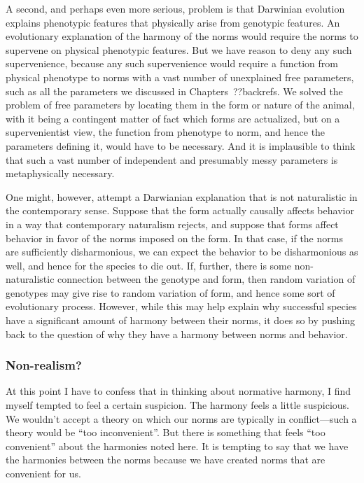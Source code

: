 A second, and perhaps even more serious, problem is that Darwinian evolution explains phenotypic features that physically arise 
from genotypic features. An evolutionary explanation of the harmony of the norms would require the norms to supervene on 
physical phenotypic features. But we have reason to deny any such supervenience, because any such supervenience would require
a function from physical phenotype to norms with a vast number of unexplained free parameters, such as all the parameters we
discussed in Chapters~??backrefs. We solved the problem of free parameters by locating them in the form or nature of the 
animal, with it being a contingent matter of fact which forms are actualized, but on a supervenientist view, the function 
from phenotype to norm, and hence the parameters defining it, would have to be necessary. And it is implausible to think 
that such a vast number of independent and presumably messy parameters is metaphysically necessary.

One might, however, attempt a Darwianian explanation that is not naturalistic in the contemporary sense. Suppose that 
the form actually causally affects behavior in a way that contemporary naturalism rejects, and suppose that forms
affect behavior in favor of the norms imposed on the form. In that case, if the norms are sufficiently disharmonious,
we can expect the behavior to be disharmonious as well, and hence for the species to die out. If, further, there is
some non-naturalistic connection between the genotype and form, then random variation of genotypes may give rise to
random variation of form, and hence some sort of evolutionary process. However, while this may help explain why 
successful species have a significant amount of harmony between their norms, it does so by pushing back to the
question of why they have a harmony between norms and behavior. 

\subsubsection{Non-realism?}\label{sec:non-realism}
At this point I have to confess that in thinking about normative harmony, I find myself tempted to feel 
a certain suspicion. The harmony feels a little suspicious. We wouldn't accept a theory on which
our norms are typically in conflict---such a theory would be ``too inconvenient''. But there is something 
that feels ``too convenient'' about the harmonies noted here. It is tempting to say that we have 
the harmonies between the norms because we have created norms that are convenient for us.


